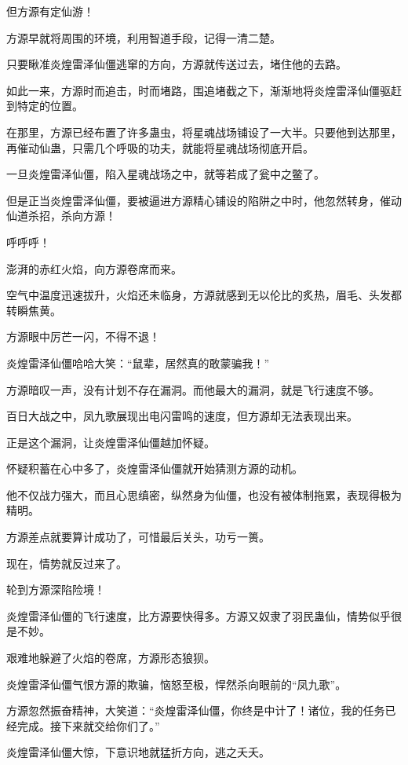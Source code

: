 \begin{this_body}
但方源有定仙游！

方源早就将周围的环境，利用智道手段，记得一清二楚。

只要瞅准炎煌雷泽仙僵逃窜的方向，方源就传送过去，堵住他的去路。

如此一来，方源时而追击，时而堵路，围追堵截之下，渐渐地将炎煌雷泽仙僵驱赶到特定的位置。

在那里，方源已经布置了许多蛊虫，将星魂战场铺设了一大半。只要他到达那里，再催动仙蛊，只需几个呼吸的功夫，就能将星魂战场彻底开启。

一旦炎煌雷泽仙僵，陷入星魂战场之中，就等若成了瓮中之鳖了。

但是正当炎煌雷泽仙僵，要被逼进方源精心铺设的陷阱之中时，他忽然转身，催动仙道杀招，杀向方源！

呼呼呼！

澎湃的赤红火焰，向方源卷席而来。

空气中温度迅速拔升，火焰还未临身，方源就感到无以伦比的炙热，眉毛、头发都转瞬焦黄。

方源眼中厉芒一闪，不得不退！

炎煌雷泽仙僵哈哈大笑：“鼠辈，居然真的敢蒙骗我！”

方源暗叹一声，没有计划不存在漏洞。而他最大的漏洞，就是飞行速度不够。

百日大战之中，凤九歌展现出电闪雷鸣的速度，但方源却无法表现出来。

正是这个漏洞，让炎煌雷泽仙僵越加怀疑。

怀疑积蓄在心中多了，炎煌雷泽仙僵就开始猜测方源的动机。

他不仅战力强大，而且心思缜密，纵然身为仙僵，也没有被体制拖累，表现得极为精明。

方源差点就要算计成功了，可惜最后关头，功亏一篑。

现在，情势就反过来了。

轮到方源深陷险境！

炎煌雷泽仙僵的飞行速度，比方源要快得多。方源又奴隶了羽民蛊仙，情势似乎很是不妙。

艰难地躲避了火焰的卷席，方源形态狼狈。

炎煌雷泽仙僵气恨方源的欺骗，恼怒至极，悍然杀向眼前的“凤九歌”。

方源忽然振奋精神，大笑道：“炎煌雷泽仙僵，你终是中计了！诸位，我的任务已经完成。接下来就交给你们了。”

炎煌雷泽仙僵大惊，下意识地就猛折方向，逃之夭夭。

\end{this_body}


